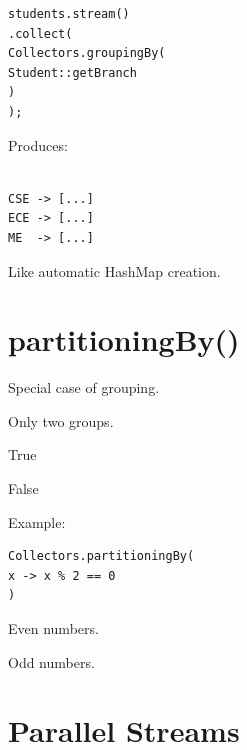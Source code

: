 \documentclass[11pt,a4paper]{book}
\begin{document}
\begin{verbatim} 
students.stream()
.collect(
Collectors.groupingBy(
Student::getBranch
)
);
\end{verbatim}


Produces:

\begin{verbatim}

CSE -> [...]
ECE -> [...]
ME  -> [...]

\end{verbatim}


Like automatic HashMap creation.


\section{partitioningBy()}

Special case of grouping.


Only two groups.


True


False


Example:

\begin{verbatim} 
Collectors.partitioningBy(
x -> x % 2 == 0
)
\end{verbatim}


Even numbers.


Odd numbers.


\section{Parallel Streams}
\end{document}
